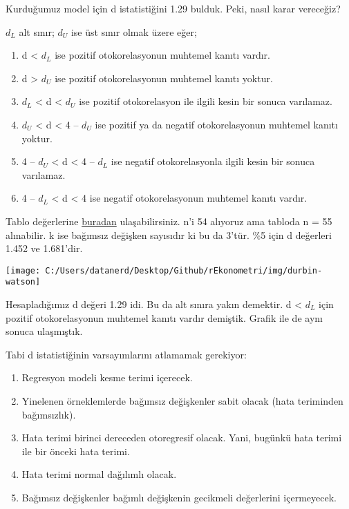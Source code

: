\documentclass[
]{book}
\begin{document}
Kurduğumuz model için d istatistiğini 1.29 bulduk. Peki, nasıl karar vereceğiz?

\(d_L\) alt sınır; \(d_U\) ise üst sınır olmak üzere eğer;

\begin{enumerate}
\def\labelenumi{\roman{enumi}.}
\item
  d \textless{} \(d_L\) ise pozitif otokorelasyonun muhtemel kanıtı vardır.
\item
  d \textgreater{} \(d_U\) ise pozitif otokorelasyonun muhtemel kanıtı yoktur.
\item
  \(d_L\) \textless{} d \textless{} \(d_U\) ise pozitif otokorelasyon ile ilgili kesin bir sonuca varılamaz.
\item
  \(d_U\) \textless{} d \textless{} 4 -- \(d_U\) ise pozitif ya da negatif otokorelasyonun muhtemel kanıtı yoktur.
\item
  4 -- \(d_U\) \textless{} d \textless{} 4 -- \(d_L\) ise negatif otokorelasyonla ilgili kesin bir sonuca varılamaz.
\item
  4 -- \(d_L\) \textless{} d \textless{} 4 ise negatif otokorelasyonun muhtemel kanıtı vardır.
\end{enumerate}

Tablo değerlerine \href{https://www3.nd.edu/~wevans1/econ30331/Durbin_Watson_tables.pdf}{buradan} ulaşabilirsiniz. n'i 54 alıyoruz ama tabloda n = 55 alınabilir. k ise bağımsız değişken sayısıdır ki bu da 3'tür. \%5 için d değerleri 1.452 ve 1.681'dir.

\texttt{[image: C:/Users/datanerd/Desktop/Github/rEkonometri/img/durbin-watson]}

Hesapladığımız d değeri 1.29 idi. Bu da alt sınıra yakın demektir. d \textless{} \(d_L\) için pozitif otokorelasyonun muhtemel kanıtı vardır demiştik. Grafik ile de aynı sonuca ulaşmıştık.

Tabi d istatistiğinin varsayımlarını atlamamak gerekiyor:

\begin{enumerate}
\def\labelenumi{\roman{enumi}.}
\item
  Regresyon modeli kesme terimi içerecek.
\item
  Yinelenen örneklemlerde bağımsız değişkenler sabit olacak (hata teriminden bağımsızlık).
\item
  Hata terimi birinci dereceden otoregresif olacak. Yani, bugünkü hata terimi ile bir önceki hata terimi.
\item
  Hata terimi normal dağılımlı olacak.
\item
  Bağımsız değişkenler bağımlı değişkenin gecikmeli değerlerini içermeyecek.
\end{enumerate}
\end{document}
